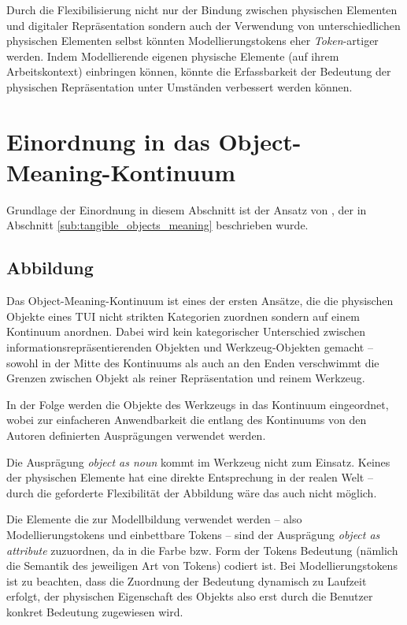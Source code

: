 Durch die Flexibilisierung nicht nur der Bindung zwischen physischen Elementen und digitaler Repräsentation sondern auch der Verwendung von unterschiedlichen physischen Elementen selbst könnten Modellierungstokens eher \emph{Token}-artiger werden. Indem Modellierende eigenen physische Elemente (auf ihrem Arbeitskontext) einbringen können, könnte die Erfassbarkeit der Bedeutung der physischen Repräsentation unter Umständen verbessert werden können.


\section{Einordnung in das Object-Meaning-Kontinuum} %
\label{sec:einordnung_in_das_object_meaning_kontinuum}

Grundlage der Einordnung in diesem Abschnitt ist der Ansatz von \citet{Underkoffler99}, der in Abschnitt \ref{sub:tangible_objects_meaning} beschrieben wurde.

\subsection{Abbildung} 

Das Object-Meaning-Kontinuum ist eines der ersten Ansätze, die die physischen Objekte eines \gls{TUI} nicht strikten Kategorien zuordnen sondern auf einem Kontinuum anordnen. Dabei wird kein kategorischer Unterschied zwischen informationsrepräsentierenden Objekten und Werkzeug-Objekten gemacht -- sowohl in der Mitte des Kontinuums als auch an den Enden verschwimmt die Grenzen zwischen Objekt als reiner Repräsentation und reinem Werkzeug. 

In der Folge werden die Objekte des Werkzeugs in das Kontinuum eingeordnet, wobei zur einfacheren Anwendbarkeit die entlang des Kontinuums von den Autoren definierten Ausprägungen verwendet werden.

Die Ausprägung \emph{object as noun} kommt im Werkzeug nicht zum Einsatz. Keines der physischen Elemente hat eine direkte Entsprechung in der realen Welt -- durch die geforderte Flexibilität der Abbildung wäre das auch nicht möglich. 

Die Elemente die zur Modellbildung verwendet werden -- also Modellierungstokens und einbettbare Tokens -- sind der Ausprägung \emph{object as attribute} zuzuordnen, da in die Farbe bzw. Form der Tokens Bedeutung (nämlich die Semantik des jeweiligen Art von Tokens) codiert ist. Bei Modellierungstokens ist zu beachten, dass die Zuordnung der Bedeutung dynamisch zu Laufzeit erfolgt, der physischen Eigenschaft des Objekts also erst durch die Benutzer konkret Bedeutung zugewiesen wird.

